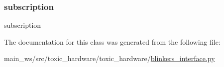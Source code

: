 \subsubsection{\texorpdfstring{subscription}{subscription}}
{\footnotesize\ttfamily subscription}



The documentation for this class was generated from the following file\+:\begin{DoxyCompactItemize}
\item 
main\+\_\+ws/src/toxic\+\_\+hardware/toxic\+\_\+hardware/\mbox{\hyperlink{blinkers__interface_8py}{blinkers\+\_\+interface.\+py}}\end{DoxyCompactItemize}
